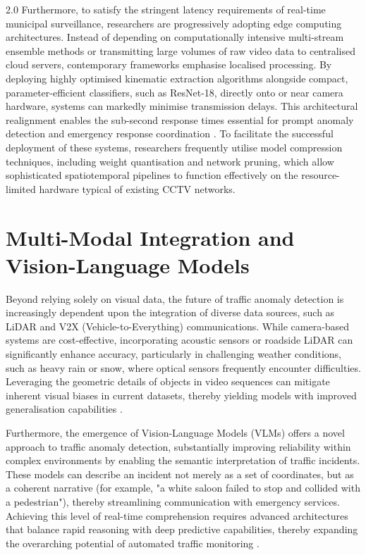 \begin{spacing}{2.0}
Furthermore, to satisfy the stringent latency requirements of real-time municipal surveillance, researchers are progressively adopting edge computing architectures. Instead of depending on computationally intensive multi-stream ensemble methods or transmitting large volumes of raw video data to centralised cloud servers, contemporary frameworks emphasise localised processing. By deploying highly optimised kinematic extraction algorithms alongside compact, parameter-efficient classifiers, such as ResNet-18, directly onto or near camera hardware, systems can markedly minimise transmission delays. This architectural realignment enables the sub-second response times essential for prompt anomaly detection and emergency response coordination \cite{somireddypalli_maneesh_kumar_ensemble_2025}. To facilitate the successful deployment of these systems, researchers frequently utilise model compression techniques, including weight quantisation and network pruning, which allow sophisticated spatiotemporal pipelines to function effectively on the resource-limited hardware typical of existing CCTV networks.

\section{Multi-Modal Integration and Vision-Language Models}
Beyond relying solely on visual data, the future of traffic anomaly detection is increasingly dependent upon the integration of diverse data sources, such as LiDAR and V2X (Vehicle-to-Everything) communications. While camera-based systems are cost-effective, incorporating acoustic sensors or roadside LiDAR can significantly enhance accuracy, particularly in challenging weather conditions, such as heavy rain or snow, where optical sensors frequently encounter difficulties. Leveraging the geometric details of objects in video sequences can mitigate inherent visual biases in current datasets, thereby yielding models with improved generalisation capabilities \cite{mahmood_new_2023}.

Furthermore, the emergence of Vision-Language Models (VLMs) offers a novel approach to traffic anomaly detection, substantially improving reliability within complex environments by enabling the semantic interpretation of traffic incidents. These models can describe an incident not merely as a set of coordinates, but as a coherent narrative (for example, "a white saloon failed to stop and collided with a pedestrian"), thereby streamlining communication with emergency services. Achieving this level of real-time comprehension requires advanced architectures that balance rapid reasoning with deep predictive capabilities, thereby expanding the overarching potential of automated traffic monitoring \cite{song_real-time_2025}.


\end{spacing}
